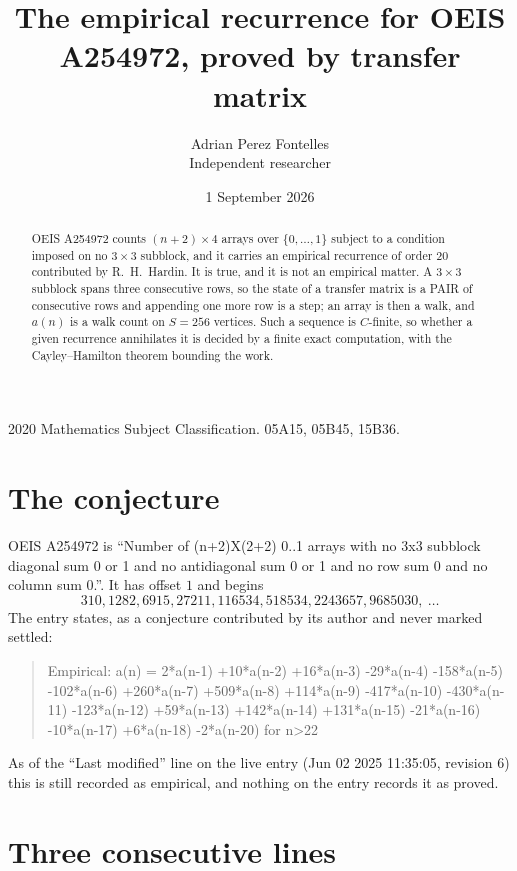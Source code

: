 \documentclass[11pt,a4paper]{article}
\title{The empirical recurrence for OEIS A254972, proved by transfer matrix}
\author{Adrian Perez Fontelles\\ \small Independent researcher}
\date{1 September 2026}
\theoremstyle{plain}
\theoremstyle{definition}
\begin{document}
\maketitle

\begin{abstract}
OEIS A254972 counts $(n+2)\times4$ arrays over $\{0,\dots,1\}$ subject to a condition imposed on
no $3\times3$ subblock, and it carries an empirical recurrence of order $20$
contributed by R.~H.~Hardin. It is true, and it is not an empirical matter. A $3\times3$
subblock spans three consecutive rows, so the state of a transfer matrix is a PAIR of
consecutive rows and appending one more row is a step; an array is then a walk, and
$a(n)$ is a walk count on $S=256$ vertices. Such a sequence is $C$-finite, so whether a given
recurrence annihilates it is decided by a finite exact computation, with the Cayley--Hamilton
theorem bounding the work.
\end{abstract}

\noindent\small 2020 Mathematics Subject Classification. 05A15, 05B45, 15B36.\normalsize

\section{The conjecture}

OEIS A254972 is ``Number of (n+2)X(2+2) 0..1 arrays with no 3x3 subblock diagonal sum 0 or 1 and no antidiagonal sum 0 or 1 and no row sum 0 and no column sum 0.''. It has offset $1$ and begins
\[
310, 1282, 6915, 27211, 116534, 518534, 2243657, 9685030,\ \dots
\]
The entry states, as a conjecture contributed by its author and never marked settled:
\begin{quote}
Empirical: a(n) = 2*a(n-1) +10*a(n-2) +16*a(n-3) -29*a(n-4) -158*a(n-5) -102*a(n-6) +260*a(n-7) +509*a(n-8) +114*a(n-9) -417*a(n-10) -430*a(n-11) -123*a(n-12) +59*a(n-13) +142*a(n-14) +131*a(n-15) -21*a(n-16) -10*a(n-17) +6*a(n-18) -2*a(n-20) for n>22
\end{quote}
As of the ``Last modified'' line on the live entry (Jun 02 2025 11:35:05, revision 6) this is still
recorded as empirical, and nothing on the entry records it as proved.

\section{Three consecutive lines}
\end{document}
